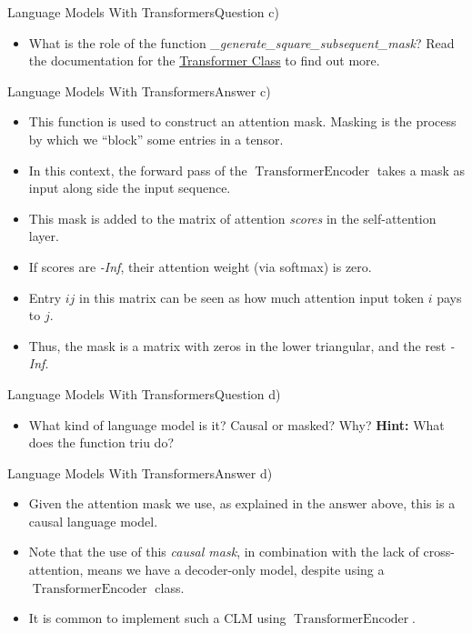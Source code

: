 \documentclass[t]{beamer}
\newcommand\op[1]{\operatorname{#1}}
\begin{document}
\begin{frame}{Language Models With Transformers}{Question c)}
    \begin{itemize}
        \item What is the role of the function
              \emph{\_generate\_square\_subsequent\_mask}? Read the documentation
              for the
              \href{https://pytorch.org/docs/stable/generated/torch.nn.TransformerEncoder.html}{Transformer Class}
              to find out more.
    \end{itemize}
\end{frame}

\begin{frame}{Language Models With Transformers}{Answer c)}
    \begin{itemize}
        \item This function is used to construct an attention mask.
              Masking is the process by which we ``block'' some entries in a
              tensor.
        \item In this context, the forward pass of the $\op{TransformerEncoder}$
              takes a mask as input along side the input sequence.
        \item This mask is added to the matrix of attention \emph{scores} in the
              self-attention layer.
        \item If scores are \emph{-Inf}, their attention weight (via softmax) is
              zero.
        \item Entry $ij$ in this matrix can be seen as how much attention input
              token $i$ pays to $j$.
        \item Thus, the mask is a matrix with zeros in the lower triangular, and
              the rest \emph{-Inf}.
    \end{itemize}
\end{frame}

\begin{frame}{Language Models With Transformers}{Question d)}
    \begin{itemize}
        \item What kind of language model is it? Causal or masked? Why?
              \textbf{Hint:} What does the function triu do?
    \end{itemize}
\end{frame}

\begin{frame}{Language Models With Transformers}{Answer d)}
    \begin{itemize}
        \item Given the attention mask we use, as explained in the answer above,
              this is a causal language model.
        \item Note that the use of this \emph{causal mask}, in combination with
              the lack of cross-attention, means we have a decoder-only model,
              despite using a $\op{TransformerEncoder}$ class.
        \item It is common to implement such a CLM using
              $\op{TransformerEncoder}$.
    \end{itemize}
\end{frame}
\end{document}
